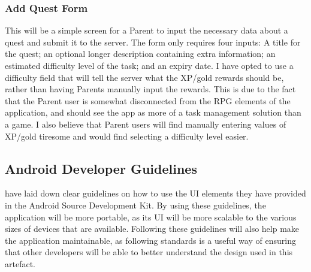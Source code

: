 \subsubsection{Add Quest Form}
This will be a simple screen for a Parent to input the necessary data about a quest and submit it to the server. 
The form only requires four inputs: A title for the quest; an optional longer description containing extra information; an estimated difficulty level of the task; and an expiry date.
I have opted to use a difficulty field that will tell the server what the XP/gold rewards should be, rather than having Parents manually input the rewards.
This is due to the fact that the Parent user is somewhat disconnected from the RPG elements of the application, and should see the app as more of a task management solution than a game.
I also believe that Parent users will find manually entering values of XP/gold tiresome and would find selecting a difficulty level easier. 

\subsection{Android Developer Guidelines}
\cite{materialdesignguidelines} have laid down clear guidelines on how to use the UI elements they have provided in the Android Source Development Kit.
By using these guidelines, the application will be more portable, as its UI will be more scalable to the various sizes of devices that are available.%
Following these guidelines will also help make the application maintainable, as following standards is a useful way of ensuring that other developers will be able to better understand the design used in this artefact.